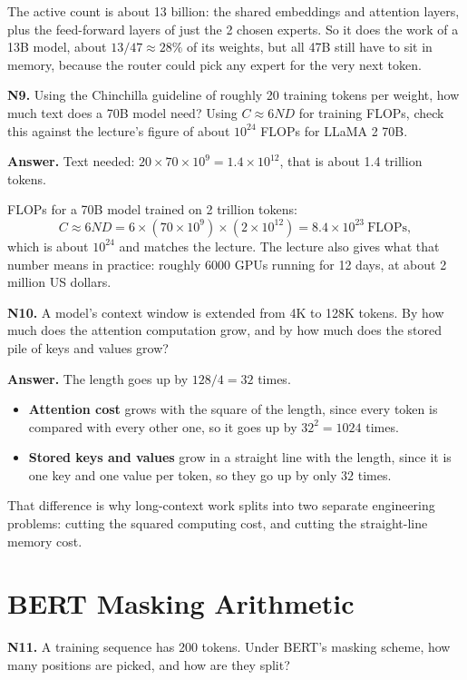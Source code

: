 \documentclass[11pt]{article}
\begin{document}
The active count is about 13 billion: the shared embeddings and attention layers, plus the
feed-forward layers of just the 2 chosen experts. So it does the work of a 13B model, about
$13/47\approx28\%$ of its weights, but all 47B still have to sit in memory, because the router
could pick any expert for the very next token.

\medskip
\textbf{N9.} Using the Chinchilla guideline of roughly 20 training tokens per weight, how much
text does a 70B model need? Using $C\approx6ND$ for training FLOPs, check this against the
lecture's figure of about $10^{24}$ FLOPs for LLaMA 2 70B.

\textbf{Answer.} Text needed: $20\times70\times10^{9}=1.4\times10^{12}$, that is about 1.4
trillion tokens.

FLOPs for a 70B model trained on 2 trillion tokens:
\[
C\approx 6ND = 6\times(70\times10^{9})\times(2\times10^{12}) = 8.4\times10^{23}\ \text{FLOPs},
\]
which is about $10^{24}$ and matches the lecture. The lecture also gives what that number
means in practice: roughly 6000 GPUs running for 12 days, at about 2 million US dollars.

\medskip
\textbf{N10.} A model's context window is extended from 4K to 128K tokens. By how much does
the attention computation grow, and by how much does the stored pile of keys and values grow?

\textbf{Answer.} The length goes up by $128/4=32$ times.

\begin{itemize}
  \item \textbf{Attention cost} grows with the square of the length, since every token is compared with every other one, so it goes up by $32^2=1024$ times.
  \item \textbf{Stored keys and values} grow in a straight line with the length, since it is one key and one value per token, so they go up by only $32$ times.
\end{itemize}

That difference is why long-context work splits into two separate engineering problems:
cutting the squared computing cost, and cutting the straight-line memory cost.

\section{BERT Masking Arithmetic}

\textbf{N11.} A training sequence has 200 tokens. Under BERT's masking scheme, how many
positions are picked, and how are they split?
\end{document}
